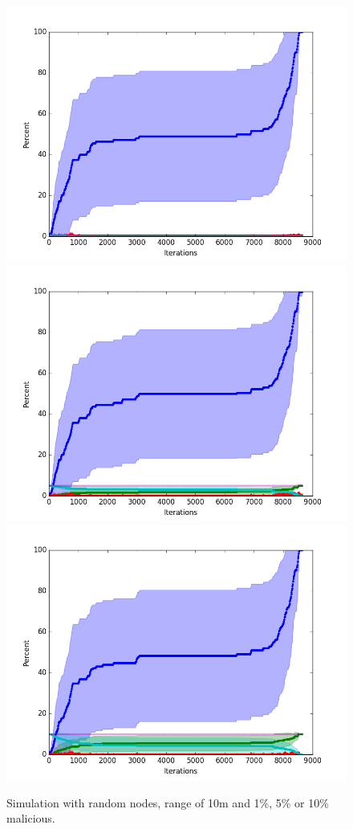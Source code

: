 \documentclass[conference]{IEEEtran}
\begin{document}
%


\begin{figure}
\centering
\includegraphics[width=0.3\linewidth]{Network_rA/10_1}
\hspace{1pt}
\includegraphics[width=0.3\linewidth]{Network_rA/10_5}
\hspace{1pt}
\includegraphics[width=0.3\linewidth]{Network_rA/10_10}
\caption{Simulation with random nodes, range of 10m and 1\%, 5\% or 10\% malicious.}
\label{fig:random0}
\end{figure}

%
\end{document}
